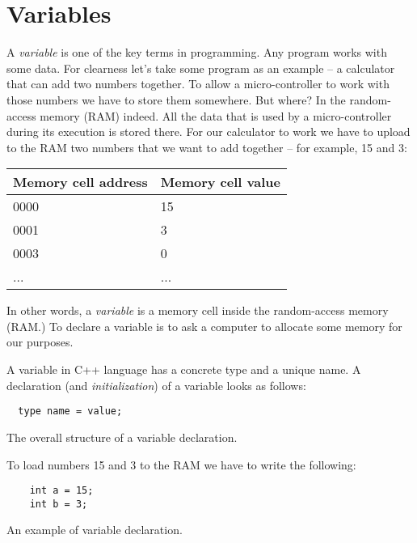 \documentclass[../sparc.tex]{subfiles}
\begin{document}
\section{Variables}

A \emph{variable} is one of the key terms in programming.  Any program works
with some data.  For clearness let's take some program as an example -- a
calculator that can add two numbers together.  To allow a micro-controller to
work with those numbers we have to store them somewhere.  But where?  In the
random-access memory (RAM) indeed.  All the data that is used by a
micro-controller during its execution is stored there.  For our calculator to
work we have to upload to the RAM two numbers that we want to add together -- for
example, 15 and 3:

\begin{tabular}{p{4cm}|p{6cm}}
  Memory cell address & Memory cell value \\
  \hline \hline
  0000 & 15 \\
  \hline
  0001 & 3 \\
  \hline
  0003 & 0 \\
  ... & ... \\
\end{tabular}

In other words, a \emph{variable} is a memory cell inside the random-access
memory (RAM.)  To declare a variable is to ask a computer to allocate some
memory for our purposes.

A variable in C++ language has a concrete type and a unique name.  A declaration
(and \emph{initialization}) of a variable looks as follows:

\begin{listing}[ht]
\begin{verbatim}
  type name = value;
\end{verbatim}
\label{listing:dialogues-with-computer-variable-definition-structure}
\caption{The overall structure of a variable declaration.}
\end{listing}

To load numbers 15 and 3 to the RAM we have to write the following:

\begin{listing}[ht]
  \begin{verbatim}
    int a = 15;
    int b = 3;
  \end{verbatim}
  \label{listing:dialogues-with-computer-variable-definition-example}
  \caption{An example of variable declaration.}
\end{listing}
\end{document}
